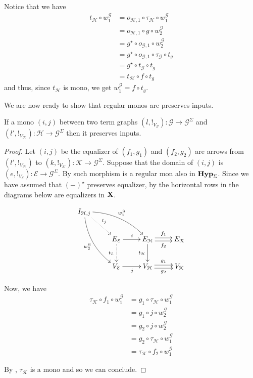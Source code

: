 \documentclass[runningheads,envcountsect]{lipics-v2021}
\def\X{\textbf {\textup{X}}}
\newcommand{\catname}[1]{\textbf{\textup{#1}}}
\newcommand{\hyp}{\catname{Hyp}}
\begin{document}
\begin{remark}\label{prop:image}
	Notice that we have
	\begin{align*}
		t_{\mathcal{H}}\circ w^{\mathcal{G}}_1&=o_{\mathcal{H},1}\circ \tau_{\mathcal{H}}\circ w^{\mathcal{G}}_1\\&=o_{\mathcal{H},1}\circ g\circ w^{\mathcal{G}}_2\\&=g^\star\circ o_{\mathcal{G},1}\circ w^{\mathcal{G}}_2\\&=g^\star \circ o_{\mathcal{G},1}\circ \tau_{\mathcal{G}}\circ t_g\\&=g^\star \circ t_{\mathcal{G}}\circ t_g\\&=t_{\mathcal{H}}\circ f\circ t_g
	\end{align*}
	and thus, since $t_{\mathcal{H}}$ is mono, we get $w^{\mathcal{G}}_1=f\circ t_g$.
\end{remark}
We are now ready to show that regular monos are preserves inputs.

\begin{lemma}\label{lem:reg} If a mono $(i,j)$ between two term graphs  $(l, !_{V_{\mathcal{G}}})\colon \mathcal{G}\to \mathcal{G}^{\Sigma}$ and  $(l', !_{V_{\mathcal{H}}})\colon \mathcal{H}\to \mathcal{G}^{\Sigma}$ then it preserves inputs.
\end{lemma}

\begin{proof}
	Let $(i,j)$ be the equalizer of $(f_1, g_1)$ and $(f_2, g_2)$ are arrows from $(l', !_{V_\mathcal{H}})$ to $(k, !_{V_\mathcal{K}})\colon \mathcal{K}\to \mathcal{G}^\Sigma$. Suppose that the domain of $(i,j)$ is  $(e, !_{V_{\mathcal{E}}})\colon \mathcal{E}\to \mathcal{{G}}^\Sigma$.
	By  such morphism is a regular mon also in $\hyp_\Sigma$. Since we have assumed that $(-)^\star$ preserves equalizer, by  the  horizontal rows in the diagrams below are equalizers in $\X$.
	
	\[\xymatrix{I_{\mathcal{H}, j} \ar@/^.4cm/[drr]^{w^{\mathcal{G}}_1}  \ar@/_.4cm/[ddr]_{w^{\mathcal{G}}_2} \ar@{.>}[dr]^{t_j}\\&E_{\mathcal{E}} \ar@{.>}[d]_{t_{\mathcal{E}}} \ar[r]^{i}& E_{\mathcal{H}} \ar[d]_{t_{\mathcal{H}}}  \ar@<.5ex>[r]^{f_1} \ar@<-.5ex>[r]_{f_2} & E_{\mathcal{K}}  \\ &V_{\mathcal{E}} \ar[r]_{j}& V_{\mathcal{H}}  \ar@<.5ex>[r]^{g_1} \ar@<-.5ex>[r]_{g_2}& V_{\mathcal{K}}}\]
	
	Now, we have
	\begin{align*}
		\tau_{\mathcal{K}}\circ f_1\circ w^{\mathcal{G}}_1&=g_1\circ \tau_\mathcal{H}\circ w^{\mathcal{G}}_1\\&=g_1\circ j\circ w^{\mathcal{G}}_2\\&=g_2\circ j\circ w^{\mathcal{G}}_2\\&=g_2\circ \tau_{\mathcal{H}}\circ w^{\mathcal{G}}_1\\&=\tau_{\mathcal{K}}\circ f_2\circ w^{\mathcal{G}}_1
	\end{align*}
	
	By , $\tau_{\mathcal{K}}$ is a mono and so we can conclude.   
\end{proof}
\end{document}
